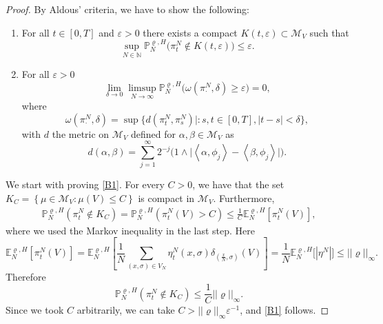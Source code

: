 \documentclass[10pt,a4paper]{amsart}
\newcommand{\E}{\mathbb{E}}
\newcommand{\p}{\mathbb{P}}
\begin{document}
\begin{proof}
    By Aldous' criteria, we have to show the following:
\begin{enumerate}[label=\textbf{B.\arabic*}]
\item \label{B1}For all $t\in[0,T]$ and $\varepsilon>0$ there exists a compact $K(t, \varepsilon) \subset \mathcal{M}_V$ such that 
    \begin{equation}
        \sup_{N\in \mathbb{N}} \p^{\varrho,H}_N\big(\pi^N_{t}\notin K(t,\varepsilon)\big) \leq \varepsilon.
    \end{equation}
\item \label{B2} For all $\varepsilon>0$
    \begin{equation}
        \lim_{\delta \to 0} \limsup_{N\to\infty} \p^{\varrho,H}_N\big(\omega(\pi^N_{\cdot},\delta)\geq \varepsilon\big) = 0,
    \end{equation}
where
    \begin{equation}
        \omega(\pi^N_{\cdot}, \delta) =\sup\{d(\pi^N_{t},\pi^N_{s})| : s,t \in [0,T], |t-s|<\delta\},
    \end{equation}
with $d$ the metric on $\mathcal{M}_V$ defined for $\alpha,\beta \in \mathcal{M}_V$ as  
    \begin{equation}
        d(\alpha,\beta) = \sum_{j=1}^\infty 2^{-j}\Big(1\wedge \big|\left<\alpha,\phi_j\right> - \left<\beta,\phi_j\right>\big|\Big).
    \end{equation}
\end{enumerate}  
We start with proving \ref{B1}. For every $C>0$, we have that the set 
$K_C = \left\{ \mu \in \mathcal{M}_V: \mu(V)\leq C\right\}$
is compact in $\mathcal{M}_V$. Furthermore,
    \begin{align}
        \p^{\varrho,H}_N(\pi^N_{t} \notin K_C) = \p^{\varrho,H}_N(\pi^N_{t}(V) > C) \leq \frac{1}{C} \E^{\varrho,H}_N[\pi^N_{t}(V)],
    \end{align}
where we used the Markov inequality in the last step. Here 
    \begin{equation}
        \E^{\varrho,H}_N[\pi^N_{t}(V)] = \E^{\varrho,H}_N\left[\frac{1}{N}\sum_{(x,\sigma) \in V_N} \eta_t^N(x,\sigma) \delta_{(\tfrac{x}{N},\sigma)}(V)\right] = \frac{1}{N} \E^{\varrho,H}_N\big[|\eta^N|\big] \leq ||\varrho||_\infty.
    \end{equation}
Therefore 
    \begin{equation}
        \p^{\varrho,H}_N(\pi^N_{t} \notin K_C) \leq \frac{1}{C} ||\varrho||_\infty.
    \end{equation}
Since we took $C$ arbitrarily, we can take $C>||\varrho||_\infty \varepsilon^{-1}$, and \ref{B1} follows. 


\end{proof}
\end{document}

